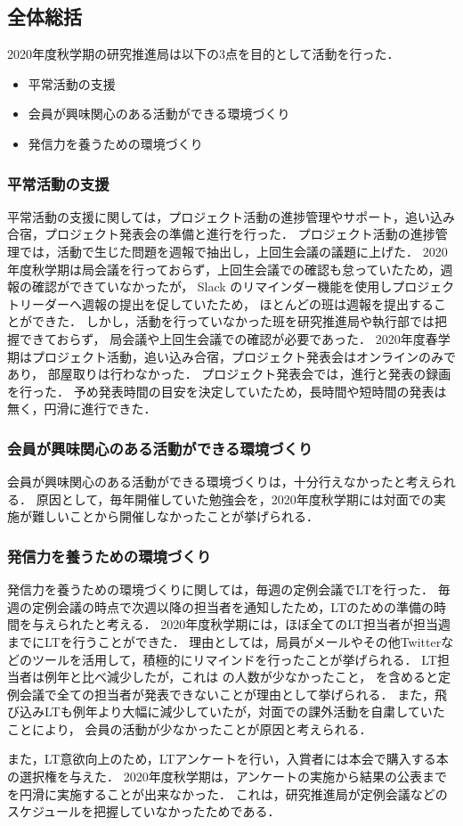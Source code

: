 \subsection*{全体総括}


2020年度秋学期の研究推進局は以下の3点を目的として活動を行った．
\begin{itemize}
\item 平常活動の支援
\item 会員が興味関心のある活動ができる環境づくり
\item 発信力を養うための環境づくり
\end{itemize}

\subsubsection*{平常活動の支援}
平常活動の支援に関しては，プロジェクト活動の進捗管理やサポート，追い込み合宿，プロジェクト発表会の準備と進行を行った．
プロジェクト活動の進捗管理では，活動で生じた問題を週報で抽出し，上回生会議の議題に上げた．
2020年度秋学期は局会議を行っておらず，上回生会議での確認も怠っていたため，週報の確認ができていなかったが，
Slack のリマインダー機能を使用しプロジェクトリーダーへ週報の提出を促していたため，
ほとんどの班は週報を提出することができた．
しかし，活動を行っていなかった班を研究推進局や執行部では把握できておらず，
局会議や上回生会議での確認が必要であった．
2020年度春学期はプロジェクト活動，追い込み合宿，プロジェクト発表会はオンラインのみであり，
部屋取りは行わなかった．
プロジェクト発表会では，進行と発表の録画を行った．
予め発表時間の目安を決定していたため，長時間や短時間の発表は無く，円滑に進行できた．

\subsubsection*{会員が興味関心のある活動ができる環境づくり}
会員が興味関心のある活動ができる環境づくりは，十分行えなかったと考えられる．
原因として，毎年開催していた勉強会を，2020年度秋学期には対面での実施が難しいことから開催しなかったことが挙げられる．

\subsubsection*{発信力を養うための環境づくり}
発信力を養うための環境づくりに関しては，毎週の定例会議でLTを行った．
毎週の定例会議の時点で次週以降の担当者を通知したため，LTのための準備の時間を与えられたと考える．
2020年度秋学期には，ほぼ全てのLT担当者が担当週までにLTを行うことができた．
理由としては，局員がメールやその他Twitterなどのツールを活用して，積極的にリマインドを行ったことが挙げられる．
LT担当者は例年と比べ減少したが，これは \firstGrade の人数が少なかったこと，
\secondGrade を含めると定例会議で全ての担当者が発表できないことが理由として挙げられる．
また，飛び込みLTも例年より大幅に減少していたが，対面での課外活動を自粛していたことにより，
会員の活動が少なかったことが原因と考えられる．

また，LT意欲向上のため，LTアンケートを行い，入賞者には本会で購入する本の選択権を与えた．
2020年度秋学期は，アンケートの実施から結果の公表までを円滑に実施することが出来なかった．
これは，研究推進局が定例会議などのスケジュールを把握していなかったためである．
